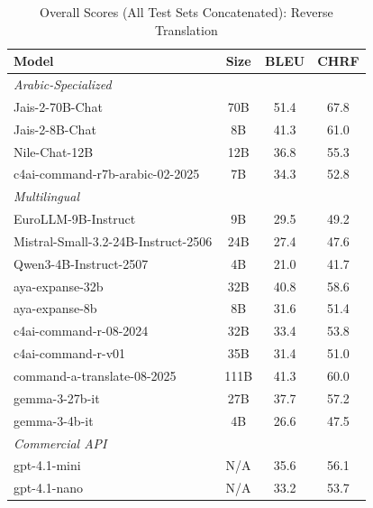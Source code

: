 \begin{table}[htbp]
\centering
\caption{Overall Scores (All Test Sets Concatenated): Reverse Translation}
\label{tab:overall_scores_reverse}
\begin{tabular}{l@{\hspace{3pt}}c@{\hspace{3pt}}c@{\hspace{3pt}}c}
\toprule
Model & Size & BLEU & CHRF \\
\midrule
\multicolumn{4}{l}{\textit{Arabic-Specialized}} \\
\midrule
Jais-2-70B-Chat & 70B & 51.4 & 67.8 \\
Jais-2-8B-Chat & 8B & 41.3 & 61.0 \\
Nile-Chat-12B & 12B & 36.8 & 55.3 \\
c4ai-command-r7b-arabic-02-2025 & 7B & 34.3 & 52.8 \\
\midrule
\multicolumn{4}{l}{\textit{Multilingual}} \\
\midrule
EuroLLM-9B-Instruct & 9B & 29.5 & 49.2 \\
Mistral-Small-3.2-24B-Instruct-2506 & 24B & 27.4 & 47.6 \\
Qwen3-4B-Instruct-2507 & 4B & 21.0 & 41.7 \\
aya-expanse-32b & 32B & 40.8 & 58.6 \\
aya-expanse-8b & 8B & 31.6 & 51.4 \\
c4ai-command-r-08-2024 & 32B & 33.4 & 53.8 \\
c4ai-command-r-v01 & 35B & 31.4 & 51.0 \\
command-a-translate-08-2025 & 111B & 41.3 & 60.0 \\
gemma-3-27b-it & 27B & 37.7 & 57.2 \\
gemma-3-4b-it & 4B & 26.6 & 47.5 \\
\midrule
\multicolumn{4}{l}{\textit{Commercial API}} \\
\midrule
gpt-4.1-mini & N/A & 35.6 & 56.1 \\
gpt-4.1-nano & N/A & 33.2 & 53.7 \\
\midrule
\bottomrule
\end{tabular}
\end{table}